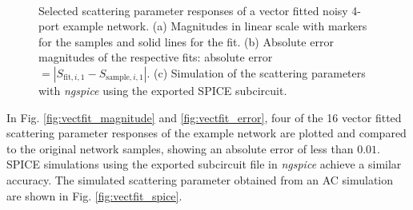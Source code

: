 \documentclass[10pt, letterpaper]{scrartcl}
\begin{document}
\begin{figure}
\centering
{}
\hfill
{}
\\
\caption{Selected scattering parameter responses of a vector fitted noisy 4-port example network. (a) Magnitudes in linear scale with markers for the samples and solid lines for the fit. (b) Absolute error magnitudes of the respective fits: absolute error $ = |S_{\mathrm{fit},i,1} - S_{\mathrm{sample},i,1}|$. (c) Simulation of the scattering parameters with \textit{ngspice} using the exported SPICE subcircuit.}
\label{figs:vectfit}
\end{figure}

In Fig. \ref{fig:vectfit_magnitude} and \ref{fig:vectfit_error}, four of the 16 vector fitted scattering parameter responses of the example network are plotted and compared to the original network samples, showing an absolute error of less than $0.01$. SPICE simulations using the exported subcircuit file in \textit{ngspice} \cite{ngspice_website} achieve a similar accuracy. The simulated scattering parameter obtained from an AC simulation are shown in Fig. \ref{fig:vectfit_spice}.
\end{document}
